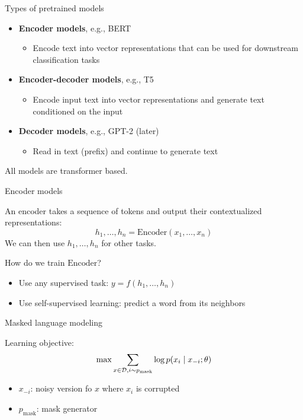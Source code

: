 \documentclass[usenames,dvipsnames,notes,11pt,aspectratio=169,hyperref={colorlinks=true, linkcolor=blue}]{beamer}
\begin{document}
\begin{frame}
    {Types of pretrained models}
   
    \begin{itemize}[<+->]
        \itemsep1em
        \item \textbf{Encoder models}, e.g., BERT
            \begin{itemize}[<.->]
                \item Encode text into vector representations that can be used for downstream classification tasks
            \end{itemize}
        \item \textbf{Encoder-decoder models}, e.g., T5
            \begin{itemize}[<.->]
                \item Encode input text into vector representations and generate text conditioned on the input
            \end{itemize}
        \item \textbf{Decoder models}, e.g., GPT-2 (later)
            \begin{itemize}[<.->]
                \item Read in text (prefix) and continue to generate text
            \end{itemize}
    \end{itemize}

    \pause\medskip
    All models are transformer based.
\end{frame}

\begin{frame}
    {Encoder models}
    
    An encoder takes a sequence of tokens and output their contextualized representations:
    $$
        h_1,\ldots,h_n = \mathrm{Encoder}(x_1,\ldots,x_n)
    $$
    We can then use $h_1,\ldots,h_n$ for other tasks.

    \pause\bigskip
    How do we train $\mathrm{Encoder}$?\\
    \begin{itemize}
        \item Use any supervised task: $y=f(h_1,\ldots,h_n)$
        \item Use self-supervised learning: predict a word from its neighbors 
    \end{itemize}
\end{frame}

\begin{frame}
    {Masked language modeling}

    Learning objective:\\
    $$
    \max \sum_{x\in\mathcal{D}, i\sim p_{\text{mask}}} \log p(x_i\mid x_{-i}; \theta)
    $$
    \vspace{-1em}
    \begin{itemize}
        \item $x_{-i}$: noisy version fo $x$ where $x_i$ is corrupted
        \item $p_{\text{mask}}$: mask generator
    \end{itemize}

    \vspace{3.5cm}
\end{frame}
\end{document}
